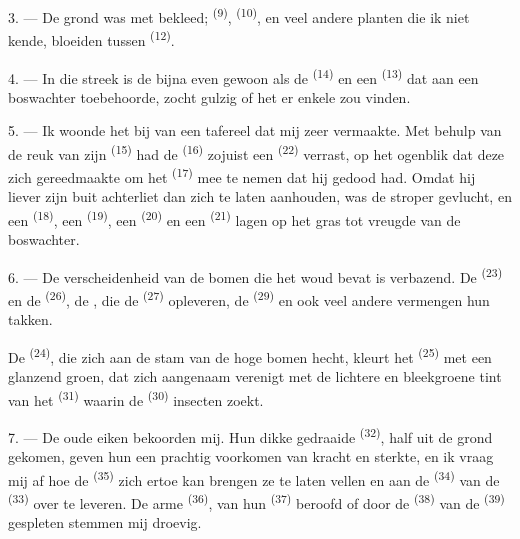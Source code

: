 3. --- De grond was met  bekleed; 
\textsuperscript{(9)},  \textsuperscript{(10)}, en veel andere planten die
ik niet kende, bloeiden tussen  \textsuperscript{(12)}.

4. --- In die streek is de  bijna even gewoon als de
 \textsuperscript{(14)} en een 
\textsuperscript{(13)} dat aan een boswachter toebehoorde, zocht gulzig of het er enkele zou
vinden.

\VUsaut{3.0mm}
\VUsaut{3.0mm}

5. --- Ik woonde het  bij van een tafereel dat mij zeer vermaakte. Met behulp
van de reuk van zijn  \textsuperscript{(15)} had de
 \textsuperscript{(16)} zojuist een 
\textsuperscript{(22)} verrast, op het ogenblik dat deze zich gereedmaakte om het
 \textsuperscript{(17)} mee te nemen dat hij gedood had. Omdat hij
liever zijn buit achterliet dan zich te laten aanhouden, was de stroper gevlucht, en een
 \textsuperscript{(18)}, een  \textsuperscript{(19)}, een
 \textsuperscript{(20)} en een
 \textsuperscript{(21)} lagen op het gras tot vreugde van de
boswachter.

6. --- De verscheidenheid van de bomen die het woud bevat is verbazend. De
 \textsuperscript{(23)} en de 
\textsuperscript{(26)}, de , die de  \textsuperscript{(27)}
opleveren, de  \textsuperscript{(29)} en ook veel andere vermengen hun takken.

De  \textsuperscript{(24)}, die zich aan de stam van de hoge bomen hecht,
kleurt het  \textsuperscript{(25)} met een glanzend groen, dat zich aangenaam
verenigt met de lichtere en bleekgroene tint van het
 \textsuperscript{(31)} waarin de 
\textsuperscript{(30)} insecten zoekt.

\VUsaut{3.0mm}
\VUsaut{3.0mm}

7. --- De oude eiken bekoorden mij. Hun dikke gedraaide 
\textsuperscript{(32)}, half uit de grond gekomen, geven hun een prachtig voorkomen van kracht
en sterkte, en ik vraag mij af hoe de  \textsuperscript{(35)} zich ertoe kan
brengen ze te laten vellen en aan de
 \textsuperscript{(34)} van de 
\textsuperscript{(33)} over te leveren. De arme  \textsuperscript{(36)}, van
hun  \textsuperscript{(37)} beroofd of door de 
\textsuperscript{(38)} van de  \textsuperscript{(39)} gespleten stemmen mij
droevig.

